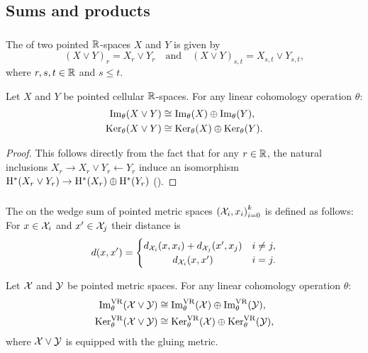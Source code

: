 
\subsection{Sums and products}\label{ss:sums_products}

\subsubsection{}

The  of two pointed \(\mathbb{R}\)-spaces \(X\) and \(Y\) is given by
\[
(X \vee Y)_r = X_r \vee Y_r \quad\text{and}\quad (X \vee Y)_{s,t} = X_{s,t} \vee Y_{s,t},
\]
where \(r, s, t \in \mathbb{R}\) and \(s \leq t\).

\lemma
Let $X$ and $Y$ be pointed cellular $\mathbb{R}$-spaces.
For any linear cohomology operation $\theta$:
\begin{align*}
	\operatorname{Im}_\theta(X \vee Y) &\cong \operatorname{Im}_\theta(X) \oplus \operatorname{Im}_\theta(Y), \\
	\operatorname{Ker}_\theta(X \vee Y) &\cong \operatorname{Ker}_\theta(X) \oplus \operatorname{Ker}_\theta(Y).
\end{align*}

\begin{proof}
	This follows directly from the fact that for any \(r \in \mathbb{R}\), the natural inclusions $X_r \to X_r \vee Y_r \leftarrow Y_r$ induce an isomorphism $\mathrm{H}^*(X_r \vee Y_r) \to \mathrm{H}^*(X_r) \oplus \mathrm{H}^*(Y_r)$ (\cite[Cor.~2.25.]{hatcher2000}).
\end{proof}

\subsubsection{}\label{ss:wedge sum}

The  on the wedge sum of pointed metric spaces ${(\mathcal{X}_i, x_i)}_{i = 0}^k$ is defined as follows: For $x \in \mathcal{X}_i$ and $x' \in \mathcal{X}_j$ their distance is
\[
d(x, x') =
\begin{cases}
	d_{\cX_i}(x, x_i) + d_{\cX_j}(x', x_j) & i \neq j, \\
	\hfil d_{\cX_i}(x, x') & i = j.
\end{cases}
\]

\theorem
Let $\mathcal{X}$ and $\mathcal{Y}$ be pointed metric spaces.
For any linear cohomology operation $\theta$:
\begin{align*}
	\operatorname{Im}_\theta^{\mathrm{VR}}(\mathcal{X} \vee \mathcal{Y}) &\cong \operatorname{Im}_\theta^{\mathrm{VR}}(\mathcal{X}) \oplus \operatorname{Im}_\theta^{\mathrm{VR}}(\mathcal{Y}), \\
	\operatorname{Ker}_\theta^{\mathrm{VR}}(\mathcal{X} \vee \mathcal{Y}) &\cong \operatorname{Ker}_\theta^{\mathrm{VR}}(\mathcal{X}) \oplus \operatorname{Ker}_\theta^{\mathrm{VR}}(\mathcal{Y}),
\end{align*}
where \(\mathcal{X} \vee \mathcal{Y}\) is equipped with the gluing metric.

